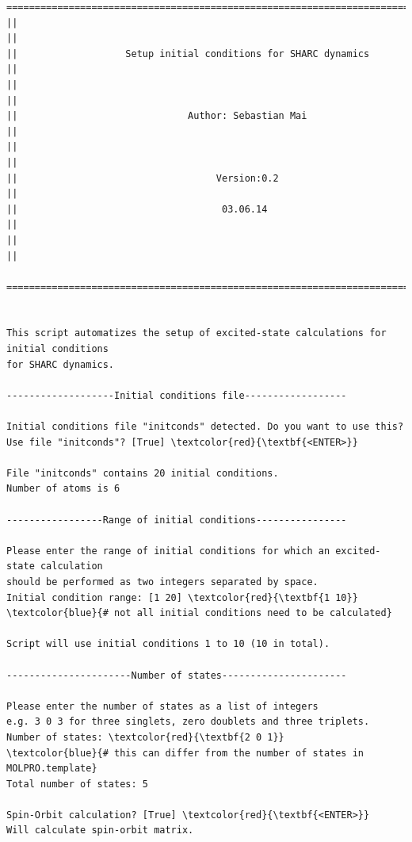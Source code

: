 \documentclass[a4paper,11pt,DIV=15,openany]{scrbook}
\begin{document}
\begin{oframed}
\footnotesize\begin{Verbatim}[commandchars=\\\{\}]
  ================================================================================
||                                                                                ||
||                   Setup initial conditions for SHARC dynamics                  ||
||                                                                                ||
||                              Author: Sebastian Mai                             ||
||                                                                                ||
||                                   Version:0.2                                  ||
||                                    03.06.14                                    ||
||                                                                                ||
  ================================================================================


This script automatizes the setup of excited-state calculations for initial conditions 
for SHARC dynamics. 
  
-------------------Initial conditions file------------------

Initial conditions file "initconds" detected. Do you want to use this?
Use file "initconds"? [True] \textcolor{red}{\textbf{<ENTER>}}

File "initconds" contains 20 initial conditions.
Number of atoms is 6

-----------------Range of initial conditions----------------

Please enter the range of initial conditions for which an excited-state calculation 
should be performed as two integers separated by space.
Initial condition range: [1 20] \textcolor{red}{\textbf{1 10}}        \textcolor{blue}{# not all initial conditions need to be calculated}

Script will use initial conditions 1 to 10 (10 in total).

----------------------Number of states----------------------

Please enter the number of states as a list of integers
e.g. 3 0 3 for three singlets, zero doublets and three triplets.
Number of states: \textcolor{red}{\textbf{2 0 1}}        \textcolor{blue}{# this can differ from the number of states in MOLPRO.template}
Total number of states: 5

Spin-Orbit calculation? [True] \textcolor{red}{\textbf{<ENTER>}}
Will calculate spin-orbit matrix.


\end{Verbatim}
\end{oframed}
\end{document}
